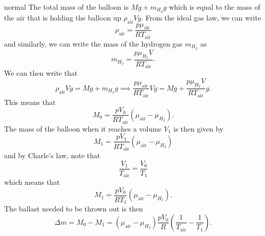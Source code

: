 \begin{solution}{normal}
The total mass of the balloon is $Mg + m_{H_2} g$ which is equal to the mass of the air that is holding the balloon up $\rho_{\text{air}} Vg$. From the ideal gas law, we can write 
\[\rho_{\text{air}} = \frac{p\mu_{\text{air}}}{RT_{\text{air}}}\]
and similarly, we can write the mass of the hydrogen gas $m_{H_2}$ as 
\[m_{H_2} = \frac{p\mu_{H_2}V}{RT_{\text{air}}}.\]
We can then write that 
\[\rho_{\text{air}} Vg = Mg + m_{H_2} g\implies  \frac{p\mu_{\text{air}}}{RT_{\text{air}}}Vg = Mg + \frac{p\mu_{H_2}V}{RT_{\text{air}}}g.\]
This means that 
\[M_0 =  \frac{pV_0}{RT_{\text{air}}} (\mu_{\text{air}} - \mu_{H_2}).\]
The mass of the balloon when it reaches a volume $V_1$ is then given by 
\[M_1 =  \frac{pV_1}{RT_{\text{air}}} (\mu_{\text{air}} - \mu_{H_2})\]
and by Charle's law, note that 
\[\frac{V_1}{T_{\text{air}}} = \frac{V_0}{T_1}\]
which means that
\[M_1 =  \frac{pV_0}{RT_1} (\mu_{\text{air}} - \mu_{H_2}).\]
The ballast needed to be thrown out is then 
\[\Delta m = M_0 - M_1 = (\mu_{\text{air}} - \mu_{H_2})\frac{pV_0}{R}\left(\frac{1}{T_{\text{air}}} - \frac{1}{T_1}\right).\]
\end{solution}
